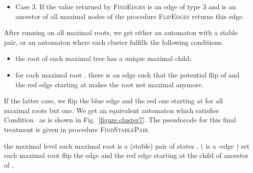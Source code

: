 \documentclass[11pt,a4paper]{article}
\begin{document}
\begin{itemize}
\begin{figure}[htbp]
{\begin{VCPicture}{(0,-1)(12,12)}
{
}
\end{VCPicture}}
        \caption{The
          picture on the left illustrates Case 2.2.3.2 of the main treatment.
          The edge  has type 2.  After flipping the edge
           and the red edge going out of , we get the
          automaton on the right part of the figure. The root  has a new single child
           ancestor of a maximal state, whose set of outgoing
          edges is a bunch. The new tree rooted at  has here the
          same level  as before and \textsc{FlipEdges} is
          called a second and last time.}
\label{figure.cluster6}
\end{figure}
\item Case 3. If the value returned by \textsc{FindEdges} is an
  edge  of type 3 and  is an ancestor of all maximal
  nodes of  the procedure \textsc{FlipEdges} returns this
  edge.
\end{itemize}

After running  on all maximal roots, we
get either an automaton with a stable pair, or an automaton where each
cluster fulfills the following conditions.
\begin{itemize}
\item the root  of each maximal tree has a unique maximal child;
\item for each maximal root , there is an edge  such
  that the potential flip of  and the red edge starting at 
   makes the root  not maximal anymore.
\end{itemize}
If the latter case, we flip the blue edge  and the red
one starting at  for all maximal roots  but one. We get an
equivalent automaton which satisfies Condition~ as is shown in
Fig.~\ref{figure.cluster7}. The pseudocode for this final treatment
is given in procedure \textsc{FindStablePair}.

\begin{small}
\begin{codebox} 
\Procname{)} 
\li  \If the maximal level 
\li  \Then  \Return 
\li   \Else \For each maximal root 
\li        \Do 
\li         \If  is a (stable) pair of states 
\li             \Then \Return , 
\li             \Else ( is a -edge ) set 
             \End
           \End
\li      \For each maximal root  
\li        \Do flip the edge  and the red edge starting at 
           \End
\label{li:FindStablePair-fin}
\li       {}
\li       the child of  ancestor of 
\label{li:FindStablePair-fin2}
\li     \Return ,  
    \End
\end{codebox}
\end{small}
\end{document}
